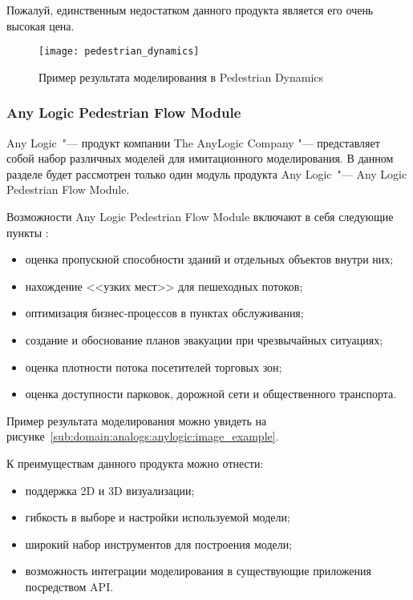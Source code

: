Пожалуй, единственным недостатком данного продукта является его очень высокая цена.

\begin{figure}[ht!]
  \texttt{[image: pedestrian\_dynamics]}
  \caption{Пример результата моделирования в Pedestrian Dynamics}
  \label{sub:domain:analogs:pd:image_example}
\end{figure}

\subsubsection{Any Logic Pedestrian Flow Module}
\label{sub:domain:analogs:anylogic}

Any Logic\textregistered\ "--- продукт компании The AnyLogic Company "--- представляет собой набор различных моделей для имитационного моделирования.
В данном разделе будет рассмотрен только один модуль продукта Any Logic\textregistered\ "--- Any Logic Pedestrian Flow Module.

Возможности Any Logic Pedestrian Flow Module включают в себя следующие пункты \cite{anylogic}:
\begin{itemize}
  \item оценка пропускной способности зданий и отдельных объектов внутри них;
  \item нахождение <<узких мест>> для пешеходных потоков;
  \item оптимизация бизнес-процессов в пунктах обслуживания;
  \item создание и обоснование планов эвакуации при чрезвычайных ситуациях;
  \item оценка плотности потока посетителей торговых зон;
  \item оценка доступности парковок, дорожной сети и общественного транспорта.
\end{itemize}

Пример результата моделирования можно увидеть на рисунке~\ref{sub:domain:analogs:anylogic:image_example}.

К преимуществам данного продукта можно отнести:
\begin{itemize}
  \item поддержка 2D и 3D визуализации;
  \item гибкость в выборе и настройки используемой модели;
  \item широкий набор инструментов для построения модели;
  \item возможность интеграции моделирования в существующие приложения посредством API.
\end{itemize}

